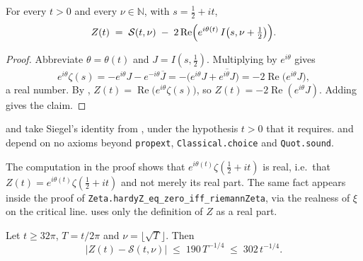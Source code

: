 \begin{theorem}
\label{thm:rsz_formula}
\leanok
{}
For every $t>0$ and every $\nu\in\mathbb{N}$, with $s=\tfrac12+it$,
\[
  Z(t)\;=\;\mathcal{S}(t,\nu)\;-\;2\operatorname{Re}
     \Bigl(e^{i\theta(t)}\,I\bigl(s,\nu+\tfrac12\bigr)\Bigr).
\]
\end{theorem}

\begin{proof}
\leanok
Abbreviate $\theta=\theta(t)$ and $J=I(s,\tfrac12)$.  Multiplying  by
$e^{i\theta}$ gives
\[
  e^{i\theta}\zeta(s)=-e^{i\theta}J-e^{-i\theta}\overline{J}
   =-\bigl(e^{i\theta}J+\overline{e^{i\theta}J}\bigr)
   =-2\operatorname{Re}\bigl(e^{i\theta}J\bigr),
\]
a real number.  By , $Z(t)=\operatorname{Re}\bigl(e^{i\theta}\zeta(s)\bigr)$,
so $Z(t)=-2\operatorname{Re}(e^{i\theta}J)$.  Adding  gives the
claim.
\end{proof}

\begin{remark}[Axioms]
\label{rem:rsz_conditional}
 and  take Siegel's identity from
, under the hypothesis $t>0$ that it requires.   and
 depend on no axioms beyond
\texttt{propext}, \texttt{Classical.choice} and \texttt{Quot.sound}.
\end{remark}

\begin{remark}[Realness of $Z$]
\label{rem:rsz_realness}
The computation in the proof shows that $e^{i\theta(t)}\zeta(\tfrac12+it)$ is real, i.e.\
that $Z(t)=e^{i\theta(t)}\zeta(\tfrac12+it)$ and not merely its real part.  The same fact
appears inside the proof of
\texttt{Zeta.hardyZ\_eq\_zero\_iff\_riemannZeta}, via the realness of $\xi$ on the critical line.
\Cref{thm:rsz_formula} uses only the definition of $Z$ as a real part.
\end{remark}

\begin{corollary}
\label{cor:rsz_bound}
\leanok
{}
Let $t\ge32\pi$, $T=t/2\pi$ and $\nu=\lfloor\sqrt T\rfloor$.  Then
\[
  \bigl\lvert Z(t)-\mathcal{S}(t,\nu)\bigr\rvert\;\le\;190\,T^{-1/4}\;\le\;302\,t^{-1/4}.
\]
\end{corollary}


